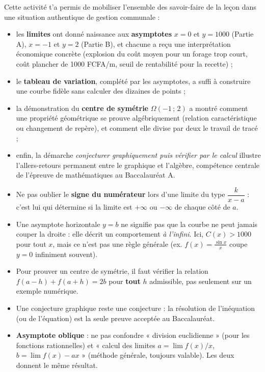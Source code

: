 \documentclass[11pt]{article}
\begin{document}
Cette activité t'a permis de mobiliser l'ensemble des savoir-faire de la leçon dans une situation authentique de gestion communale :
\begin{itemize}
\item les \textbf{limites} ont donné naissance aux \textbf{asymptotes} $x = 0$ et $y = \num{1000}$ (Partie A), $x = -1$ et $y = 2$ (Partie B), et chacune a reçu une interprétation économique concrète (explosion du coût moyen pour un forage trop court, coût plancher de \num{1000} FCFA/m, seuil de rentabilité pour la recette) ;
\item le \textbf{tableau de variation}, complété par les asymptotes, a suffi à construire une courbe fidèle sans calculer des dizaines de points ;
\item la démonstration du \textbf{centre de symétrie} $\Omega(-1\,;\,2)$ a montré comment une propriété géométrique se prouve algébriquement (relation caractéristique ou changement de repère), et comment elle divise par deux le travail de tracé ;
\item enfin, la démarche \emph{conjecturer graphiquement puis vérifier par le calcul} illustre l'allers-retours permanent entre le graphique et l'algèbre, compétence centrale de l'épreuve de mathématiques au Baccalauréat A.
\end{itemize}

\begin{attention}
\begin{itemize}
\item Ne pas oublier le \textbf{signe du numérateur} lors d'une limite du type $\dfrac{k}{x - a}$ : c'est lui qui détermine si la limite est $+\infty$ ou $-\infty$ de chaque côté de $a$.
\item Une asymptote horizontale $y = b$ ne signifie pas que la courbe ne peut jamais couper la droite : elle décrit un comportement \emph{à l'infini}. Ici, $C(x) > \num{1000}$ pour tout $x$, mais ce n'est pas une règle générale (ex. $f(x) = \frac{\sin x}{x}$ coupe $y=0$ infiniment souvent).
\item Pour prouver un centre de symétrie, il faut vérifier la relation $f(a-h)+f(a+h)=2b$ pour \textbf{tout} $h$ admissible, pas seulement sur un exemple numérique.
\item Une conjecture graphique reste une conjecture : la résolution de l'inéquation (ou de l'équation) est la seule preuve acceptée au Baccalauréat.
\item \textbf{Asymptote oblique} : ne pas confondre « division euclidienne » (pour les fonctions rationnelles) et « calcul des limites $a = \lim f(x)/x$, $b = \lim f(x)-ax$ » (méthode générale, toujours valable). Les deux donnent le même résultat.
\end{itemize}
\end{attention}
\end{document}
